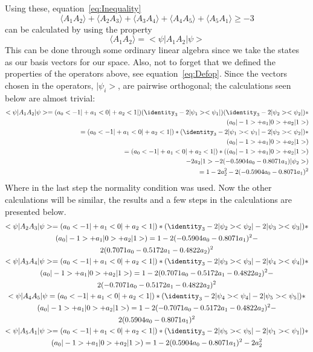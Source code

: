Using these, equation~\ref{eq:Inequality} 
\begin{equation*}
\langle A_1 A_2 \rangle + \langle A_2 A_3 \rangle + \langle A_3 A_4 \rangle + \langle A_4 A_5 \rangle +
\langle A_5 A_1 \rangle \geq -3
\end{equation*}
can be calculated by using the property
\begin{equation} 
\langle A_1 A_2 \rangle = <\psi|A_1 A_2|\psi>
\end{equation} 
This can be done through some ordinary linear algebra since we take the states as our basis vectors for our space. Also, not to forget that we defined the properties of the operators above, see equation~\ref{eq:Defop}. Since the vectors chosen in the operators, $|\psi_i>$, are pairwise orthogonal; the calculations seen below are almost trivial:
\begin{equation}
\begin{aligned}
<\psi|A_1 A_2|\psi>=(a_0<-1|+a_1<0|+a_2<1|)(\identity_3-2|\psi_1><\psi_1|)(\identity_3-2|\psi_2><\psi_2|)*
\\(a_0|-1>+a_1|0>+a_2|1>)
\\=(a_0<-1|+a_1<0|+a_2<1|)*(\identity_3-2|\psi_1><\psi_1|-2|\psi_2><\psi_2|)*
\\(a_0|-1>+a_1|0>+a_2|1>)
\\=(a_0<-1|+a_1<0|+a_2<1|)*((a_0|-1>+a_1|0>+a_2|1>)
\\-2a_2|1>-2(-0.5904a_0-0.8071a_1)|\psi_2>)
\\=1-2a_2^2-2(-0.5904a_0-0.8071a_1)^2
\end{aligned}
\end{equation}
Where in the last step the normality condition was used. Now the other calculations will be similar, the results and a few steps in the calculations are presented below.
\begin{multline}
<\psi|A_2 A_3|\psi>=(a_0<-1|+a_1<0|+a_2<1|)*(\identity_3-2|\psi_2><\psi_2|-2|\psi_3><\psi_3|)*
\\(a_0|-1>+a_1|0>+a_2|1>)=1-2(-0.5904a_0-0.8071a_1)^2-
\\2(0.7071a_0-0.5172a_1-0.4822a_2)^2
\\
<\psi|A_3 A_4|\psi>=(a_0<-1|+a_1<0|+a_2<1|)*(\identity_3-2|\psi_3><\psi_3|-2|\psi_4><\psi_4|)*
\\(a_0|-1>+a_1|0>+a_2|1>)=1-2(0.7071a_0-0.5172a_1-0.4822a_2)^2-
\\2(-0.7071a_0-0.5172a_1-0.4822a_2)^2
\\
<\psi|A_4 A_5|\psi=(a_0<-1|+a_1<0|+a_2<1|)*(\identity_3-2|\psi_4><\psi_4|-2|\psi_5><\psi_5|)*
\\(a_0|-1>+a_1|0>+a_2|1>)=1-2(-0.7071a_0-0.5172a_1-0.4822a_2)^2-
\\2(0.5904a_0-0.8071a_1)^2
\\
<\psi|A_5 A_1|\psi>=(a_0<-1|+a_1<0|+a_2<1|)*(\identity_3-2|\psi_5><\psi_5|-2|\psi_1><\psi_1|)*
\\(a_0|-1>+a_1|0>+a_2|1>)=1-2(0.5904a_0-0.8071a_1)^2-2a_2^2
\end{multline}
